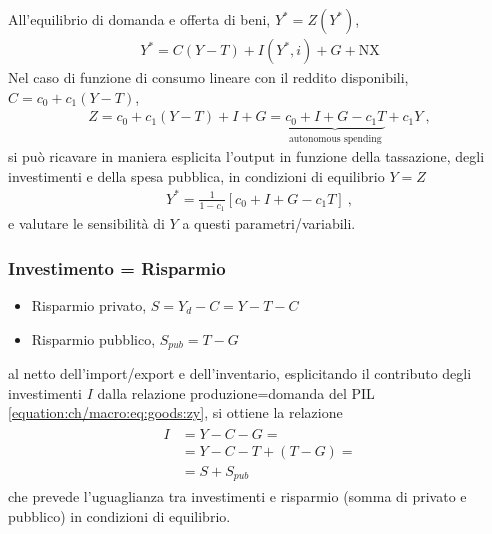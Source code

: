 \documentclass[letterpaper,10pt,italian]{jupyterBook}
\begin{document}
\sphinxAtStartPar
{} All’equilibrio di domanda e offerta di beni, \(Y^* = Z(Y^*)\),
\begin{equation}\label{equation:ch/macro:eq:goods:zy}
\begin{split}Y^* = C(Y-T) + I(Y^*,i) + G + \text{NX}\end{split}
\end{equation}
\sphinxAtStartPar
{} Nel caso di funzione di consumo lineare con il reddito disponibili, \(C = c_0 + c_1 (Y- T)\),
\begin{equation*}
\begin{split}Z = c_0 + c_1 (Y-T) + I + G = \underbrace{c_0 + I + G - c_1 T}_{\text{autonomous spending}} + c_1 Y \ ,\end{split}
\end{equation*}
\sphinxAtStartPar
si può ricavare in maniera esplicita l’output in funzione della tassazione, degli investimenti e della spesa pubblica, in condizioni di equilibrio \(Y = Z\)
\begin{equation*}
\begin{split}Y^* = \frac{1}{1-c_1} \left[ c_0 + I + G - c_1 T \right] \ ,\end{split}
\end{equation*}
\sphinxAtStartPar
e valutare le sensibilità di \(Y\) a questi parametri/variabili.  


\subsubsection{Investimento = Risparmio}
\label{\detokenize{ch/macro:investimento-risparmio}}\label{\detokenize{ch/macro:economics-hs-macro-short-run-goods-market-i-s}}\begin{itemize}
\item {} 
\sphinxAtStartPar
Risparmio privato, \(S = Y_d - C = Y - T - C\)

\item {} 
\sphinxAtStartPar
Risparmio pubblico, \(S_{pub} = T - G\)

\end{itemize}

\sphinxAtStartPar
al netto dell’import/export e dell’inventario, esplicitando il contributo degli investimenti \(I\) dalla relazione produzione=domanda del PIL \eqref{equation:ch/macro:eq:goods:zy}, si ottiene la relazione
\begin{equation}\label{equation:ch/macro:eq:goods:is}
\begin{split}\begin{aligned}
  I & = Y - C - G = \\
    & = Y - C -  T + ( T - G ) = \\
    & = S + S_{pub} 
\end{aligned}\end{split}
\end{equation}
\sphinxAtStartPar
che prevede l’uguaglianza tra investimenti e risparmio (somma di privato e pubblico) in condizioni di equilibrio.
\end{document}
